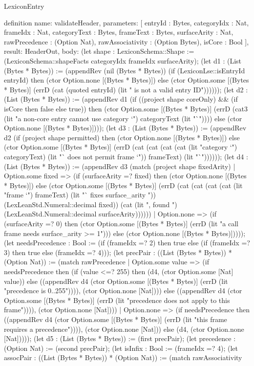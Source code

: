 \begin{lexlean}{LexiconEntry}
\begin{semanticmodule}
definition{
  name: validateHeader,
  parameters: [
    entryId : Bytes,
    categoryIdx : Nat,
    frameIdx : Nat,
    categoryText : Bytes,
    frameText : Bytes,
    surfaceArity : Nat,
    rawPrecedence : (Option Nat),
    rawAssociativity : (Option Bytes),
    isCore : Bool
  ],
  result: HeaderOut,
  body: (let shape : LexiconSchema::Shape := (LexiconSchema::shapeFacts categoryIdx frameIdx surfaceArity); (let d1 : (List (Bytes * Bytes)) := (appendRev (nil (Bytes * Bytes)) (if (LexiconLse::isEntryId entryId) then (ctor Option.none [(Bytes * Bytes)]) else (ctor Option.some [(Bytes * Bytes)] (errD (cat (quoted entryId) (lit " is not a valid entry ID")))))); (let d2 : (List (Bytes * Bytes)) := (appendRev d1 (if ((project shape coreOnly) && (if isCore then false else true)) then (ctor Option.some [(Bytes * Bytes)] (errD (cat3 (lit "a non-core entry cannot use category `") categoryText (lit "`")))) else (ctor Option.none [(Bytes * Bytes)]))); (let d3 : (List (Bytes * Bytes)) := (appendRev d2 (if (project shape permitted) then (ctor Option.none [(Bytes * Bytes)]) else (ctor Option.some [(Bytes * Bytes)] (errD (cat (cat (cat (cat (lit "category `") categoryText) (lit "` does not permit frame `")) frameText) (lit "`")))))); (let d4 : (List (Bytes * Bytes)) := (appendRev d3 (match (project shape fixedArity)
    | Option.some fixed => (if (surfaceArity =? fixed) then (ctor Option.none [(Bytes * Bytes)]) else (ctor Option.some [(Bytes * Bytes)] (errD (cat (cat (cat (cat (lit "frame `") frameText) (lit "` fixes surface_arity ")) (LexLeanStd.Numeral::decimal fixed)) (cat (lit ", found ") (LexLeanStd.Numeral::decimal surfaceArity))))))
    | Option.none => (if (surfaceArity =? 0) then (ctor Option.some [(Bytes * Bytes)] (errD (lit "a call frame needs surface_arity >= 1"))) else (ctor Option.none [(Bytes * Bytes)])))); (let needsPrecedence : Bool := (if (frameIdx =? 2) then true else (if (frameIdx =? 3) then true else (frameIdx =? 4))); (let precPair : ((List (Bytes * Bytes)) * (Option Nat)) := (match rawPrecedence
    | Option.some value => (if needsPrecedence then (if (value <=? 255) then (d4, (ctor Option.some [Nat] value)) else ((appendRev d4 (ctor Option.some [(Bytes * Bytes)] (errD (lit "precedence is 0..255")))), (ctor Option.none [Nat]))) else ((appendRev d4 (ctor Option.some [(Bytes * Bytes)] (errD (lit "precedence does not apply to this frame")))), (ctor Option.none [Nat])))
    | Option.none => (if needsPrecedence then ((appendRev d4 (ctor Option.some [(Bytes * Bytes)] (errD (lit "this frame requires a precedence")))), (ctor Option.none [Nat])) else (d4, (ctor Option.none [Nat])))); (let d5 : (List (Bytes * Bytes)) := (first precPair); (let precedence : (Option Nat) := (second precPair); (let isInfix : Bool := (frameIdx =? 4); (let assocPair : ((List (Bytes * Bytes)) * (Option Nat)) := (match rawAssociativity
}
\end{semanticmodule}
\end{lexlean}
